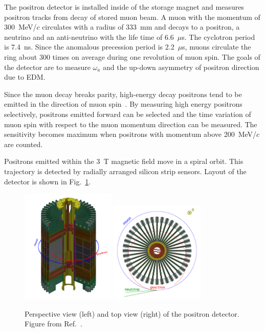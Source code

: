 The positron detector is installed inside of the storage magnet
and measures positron tracks from decay of stored muon beam.
A muon with the momentum of 300~MeV/$c$ circulates with a radius
of 333~mm and decays to a positron, a neutrino and an anti-neutrino
with the life time of 6.6~$\mu$s. The cyclotron period is 7.4~ns.
Since the anomalous precession period is 2.2~$\mu$s, muons circulate
the ring about 300 times on average during one revolution of muon spin.
The goals of the detector are to measure $\omega_{a}$
and the up-down asymmetry of positron direction due to EDM.

Since the muon decay breaks parity, high-energy decay positrons tend to be emitted
in the direction of muon spin~\cite{Michel:1949qe}. By measuring high energy positrons
selectively, positrons emitted forward can be selected and
the time variation of muon spin with respect to the muon momentum direction
can be measured. The sensitivity becomes maximum when positrons
with momentum above 200~MeV/$c$ are counted.

Positrons emitted within the 3~T magnetic field move in a spiral orbit.
This trajectory is detected by radially arranged silicon strip sensors.
Layout of the detector is shown in Fig.~\ref{fig:Detector_overview}. 

\begin{figure}[t]
  \begin{center}
    \includegraphics[width=0.4\textwidth, bb=0 0 393 511]{Fig/Detector_cutview.png}
    \includegraphics[width=0.4\textwidth, bb=0 0 337 369]{Fig/Detector_topview.png}
    \caption{Perspective view (left) and top view (right) of the positron detector. Figure from Ref.~\cite{TDRsummarypaper}.}
    \label{fig:Detector_overview}
  \end{center}
\end{figure}

